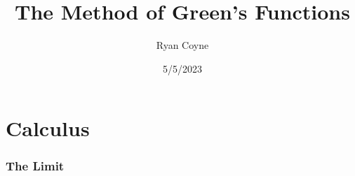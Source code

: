 \documentclass{beamer}
\title{The Method of Green's Functions}
\author{Ryan Coyne}
\institute[NHTI]{NHTI-Concord's Community College}
\date{5/5/2023}
\begin{document}
\frame{\titlepage}

\section*{Calculus}

\begin{frame}
\frametitle{The Limit}

\end{frame}
\end{document}
